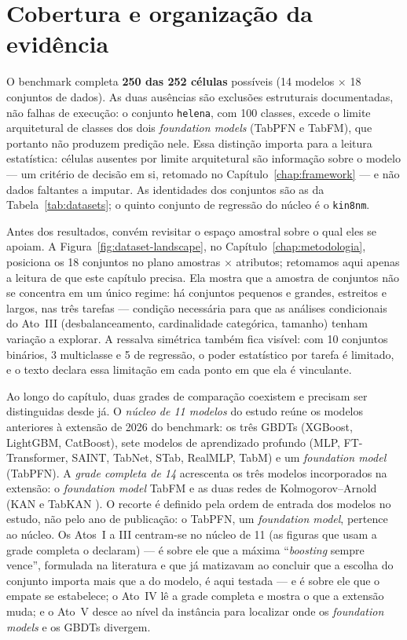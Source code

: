 \section{Cobertura e organização da evidência}
\label{sec:cap5-cobertura}

O benchmark completa \textbf{250 das 252 células} possíveis (14 modelos
$\times$ 18 conjuntos de dados). As duas ausências são exclusões
estruturais documentadas, não falhas de execução: o conjunto
\texttt{helena}, com 100 classes, excede o limite arquitetural de classes
dos dois \emph{foundation models} (TabPFN e TabFM), que portanto não
produzem predição nele. Essa distinção importa para a leitura
estatística: células ausentes por limite arquitetural são informação
sobre o modelo --- um critério de decisão em si, retomado no
Capítulo~\ref{chap:framework} --- e não dados faltantes a imputar.
As identidades dos conjuntos são as da
Tabela~\ref{tab:datasets}; o quinto conjunto de regressão do núcleo é
o \texttt{kin8nm}.

Antes dos resultados, convém revisitar o espaço amostral sobre o qual
eles se apoiam. A Figura~\ref{fig:dataset-landscape}, no Capítulo~\ref{chap:metodologia},
posiciona os 18 conjuntos no plano amostras $\times$ atributos;
retomamos aqui apenas a leitura de que este capítulo precisa. Ela mostra
que a amostra de conjuntos não se concentra em um único
regime: há conjuntos pequenos e grandes, estreitos e largos, nas três
tarefas --- condição necessária para que as análises condicionais do
Ato~III (desbalanceamento, cardinalidade categórica, tamanho) tenham
variação a explorar. A ressalva simétrica também fica visível: com 10
conjuntos binários, 3 multiclasse e 5 de regressão, o poder estatístico
por tarefa é limitado, e o texto declara essa limitação em cada ponto em
que ela é vinculante.

Ao longo do capítulo, duas grades de comparação coexistem e precisam ser
distinguidas desde já. O \emph{núcleo de 11 modelos} do estudo reúne os
modelos anteriores à extensão de 2026 do benchmark: os três GBDTs
(XGBoost, LightGBM, CatBoost), sete modelos de aprendizado profundo (MLP,
FT-Transformer, SAINT, TabNet, STab, RealMLP, TabM) e um \emph{foundation model}
(TabPFN). A \emph{grade completa de 14} acrescenta os três modelos
incorporados na extensão: o \emph{foundation model} TabFM
\citep{tabfm2026,kong2026} e as duas redes de Kolmogorov--Arnold (KAN
\citep{kan2024} e TabKAN \citep{tabkan2025}). O recorte é definido pela ordem de entrada dos modelos no estudo, não
pelo ano de publicação: o TabPFN, um \emph{foundation model}, pertence
ao núcleo. Os Atos~I a III centram-se no
núcleo de 11 (as figuras que usam a grade completa o declaram) ---
é sobre ele que a máxima ``\emph{boosting} sempre
vence'', formulada na literatura \citep{grinsztajn2022} e que
\citet{mcelfresh2023} já matizavam ao concluir que a escolha do
conjunto importa mais que a do modelo, é aqui testada --- e é sobre
ele
que o empate se estabelece; o Ato~IV lê a grade completa e mostra o que a
extensão muda; e o Ato~V desce ao nível da instância para localizar onde
os \emph{foundation models} e os GBDTs divergem.

